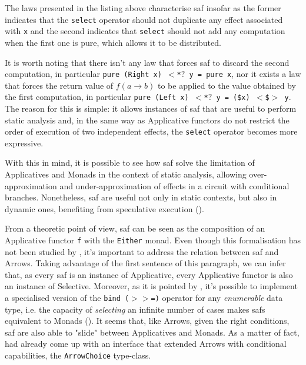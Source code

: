 \documentclass[
  oneside,
  11pt, a4paper,
  footinclude=true,
  headinclude=true,
  cleardoublepage=empty
]{scrbook}
\theoremstyle{definition}
\theoremstyle{definition}
\begin{document}
	            The laws presented in the listing above characterise \gls{saf} insofar as the former indicates that the \texttt{select} operator should not duplicate any effect associated with \texttt{x} and the second indicates that \texttt{select} should not add any computation when the first one is pure, which allows it to be distributed.
	            
	            It is worth noting that there isn't any law that forces \gls{saf} to discard the second computation, in particular \texttt{pure (Right x) $<$*$?$ y = pure x}, nor it exists a law that forces the return value of $f (a \rightarrow b)$ to be applied to the value obtained by the first computation, in particular \texttt{pure (Left x) $<$*$?$ y = (\$x) $<$\$$>$ y}. The reason for this is simple: it allows instances of \gls{saf} that are useful to perform static analysis and, in the same way as Applicative functors do not restrict the order of execution of two independent effects, the \texttt{select} operator becomes more expressive.
	            
	            With this in mind, it is possible to see how \gls{saf} solve the limitation of Applicatives and Monads in the context of static analysis, allowing over-approximation and under-approximation of effects in a circuit with conditional branches. Nonetheless, \gls{saf} are useful not only in static contexts, but also in dynamic ones, benefiting from speculative execution (\cite{andrey2019selective}).
	            
	            From a theoretic point of view, \gls{saf} can be seen as the composition of an Applicative functor \texttt{f} with the \texttt{Either} monad. Even though this formalisation has not been studied by \cite{andrey2019selective}, it's important to address the relation between \gls{saf} and Arrows. Taking advantage of the first sentence of this paragraph, we can infer that, as every \gls{saf} is an instance of Applicative, every Applicative functor is also an instance of Selective. Moreover, as it is pointed by \cite{andrey2019selective}, it's possible to implement a specialised version of the \texttt{bind ($>>$=)} operator for any \emph{enumerable} data type, i.e. the capacity of \emph{selecting} an infinite number of cases makes \glspl{saf} equivalent to Monads (\cite{gist_2019}). It seems that, like Arrows, given the right conditions, \gls{saf} are also able to "slide" between Applicatives and Monads. As a matter of fact, \cite{Hughes:2000:GMA:347238.347246} had already come up with an interface that extended Arrows with conditional capabilities, the \texttt{ArrowChoice} type-class.
	            
\end{document}
